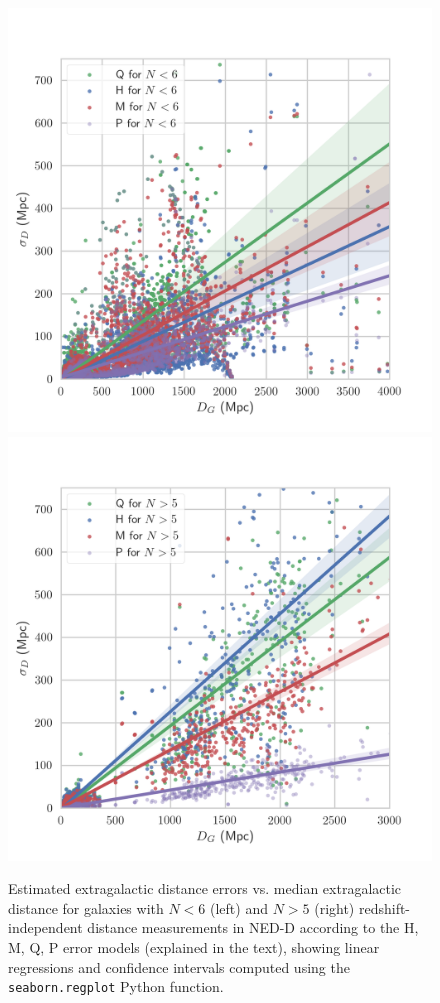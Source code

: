 \documentclass[a4paper,fleqn,usenatbib]{mnras}
\begin{document}
\begin{figure}
	\includegraphics[scale=0.69]{f01Nlow.png}
	\includegraphics[scale=0.69]{f02Nhigh.png}
    \caption{Estimated extragalactic distance errors vs. median extragalactic distance for galaxies with $N<6$ (left) and $N>5$ (right)  redshift-independent distance measurements in NED-D according to the H, M, Q, P error models  (explained in the text), showing linear regressions and confidence intervals computed using the \texttt{seaborn.regplot} Python function.}
    \label{fig:NED}
\end{figure}
\end{document}
